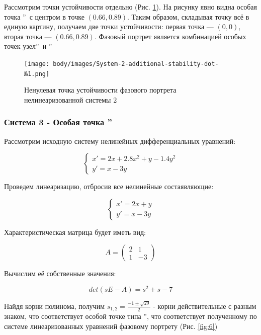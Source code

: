 Рассмотрим точки устойчивости отдельно (Рис. \ref{fig:5}). На рисунку явно видна особая
точка \textquotedblright\ с центром в точке $(0.66, 0.89)$. Таким образом,
складывая точку всё в единую картину, получаем две точки устойчивости: первая точка — $(0, 0)$,
вторая точка — $(0.66, 0.89)$. Фазовый портрет является комбинацией особых точек
 узел\textquotedblright\ и \textquotedblright

\begin{figure}[H]
	\centering
	\texttt{[image: body/images/System-2-additional-stability-dot-№1.png]}
	\caption{Ненулевая точка устойчивости фазового портрета нелинеаризованной системы 2}
	\label{fig:5}
\end{figure}

\subsubsection{Система 3 - Особая точка \textquotedblright}

Рассмотрим исходную систему нелинейных дифференциальных уравнений:

$$
\begin{cases}
x' = 2x +  2.8x^2 + y - 1.4y^2\\
y' = x - 3y
\end{cases}
$$

Проведем линеаризацию, отбросив все нелинейные состаявляющие:

$$
\begin{cases}
	x' = 2x + y \\
	y' = x - 3y
\end{cases}
$$

Характеристическая матрица будет иметь вид:

$$
A = 
\begin{pmatrix}
	2 & 1 \\
	1 & -3
\end{pmatrix}
$$

Вычислим её собственные значения:

$$
det(sE - A) = s^2 + s - 7
$$

Найдя корни полинома, получим $s_{1,2} = \frac{-1\pm\sqrt{29}}{2}$ - корни действительные с разным знаком, 
что соответствует особой точке типа \textquotedblright, 
что соответствует полученному по системе линеаризованных уравнений фазовому портрету (Рис. \ref{fig:6})

